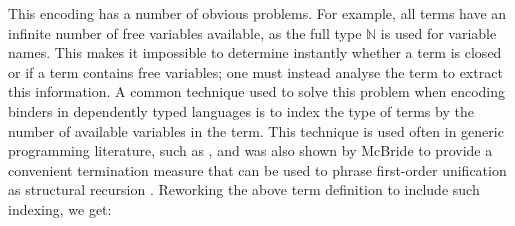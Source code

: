 \documentclass[a4paper]{jfp}
\begin{document}
This encoding has a number of obvious problems. For example, all terms have an infinite number of free variables available, as the full type
$\mathbb{N}$ is used for variable names. This makes it impossible to determine instantly whether a term is closed or if a term contains free
variables; one must instead analyse the term to extract this information. A common technique used to solve this problem when encoding binders in
dependently typed languages is to index the type of terms by the number of available variables in the term. This technique is used often in generic
programming literature, such as \cite{Morris04exploringthe}, and was also shown by McBride to provide a convenient termination measure that can be
used to phrase first-order unification as structural recursion \cite{McBride:2003bg}. Reworking the above term definition to include such indexing, we
get:
\end{document}
